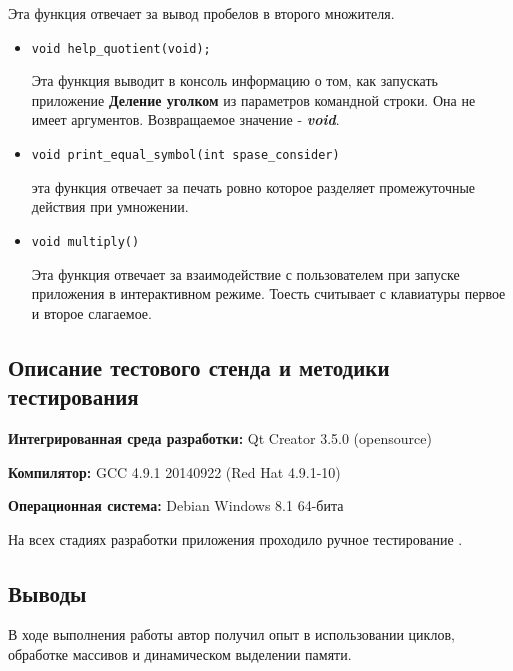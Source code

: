 \documentclass[12pt,a4paper]{report}
\begin{document}
\begin{enumerate}
\begin{itemize}
Эта функция отвечает за вывод пробелов в второго множителя.

\begin{itemize}
\item \verb-void help_quotient(void);-

Эта функция выводит в консоль информацию о том, как запускать приложение \textbf{Деление уголком} из параметров командной строки. Она не имеет аргументов. Возвращаемое значение - \textit{\textbf{void}}. 
\end{itemize}

\begin{itemize}
\item \verb-void print_equal_symbol(int spase_consider)-

эта функция отвечает за печать ровно которое разделяет промежуточные действия при умножении.
\end{itemize}

\begin{itemize}
\item \verb-void multiply()-

Эта функция отвечает за взаимодействие с пользователем при запуске приложения в интерактивном режиме. Тоесть считывает с клавиатуры первое и второе слагаемое.
\end{itemize}
\end{itemize}
\subsection{Описание тестового стенда и методики тестирования}

\begin{flushleft}
\textbf{Интегрированная среда разработки:} Qt Creator 3.5.0 (opensource)

\textbf{Компилятор:} GCC 4.9.1 20140922 (Red Hat 4.9.1-10)

\textbf{Операционная система:} Debian Windows 8.1 64-бита

\end{flushleft}

На всех стадиях разработки приложения проходило ручное тестирование . 

\end{enumerate}
\subsection{Выводы}
\hspace{\parindent}
В ходе выполнения работы автор получил опыт в использовании циклов, обработке массивов и динамическом выделении памяти.
\end{document}
